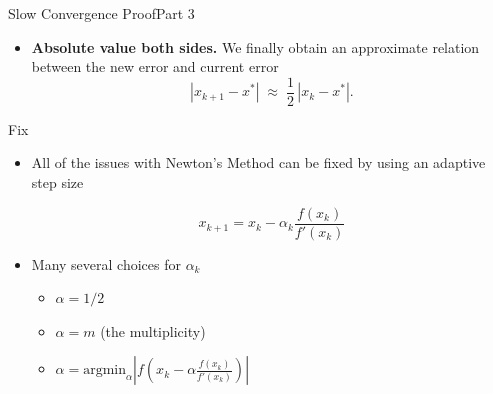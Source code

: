 \documentclass[10pt]{beamer}
\begin{document}
\begin{frame}{Slow Convergence Proof}{Part 3}

\begin{itemize}
\item[6.] \textbf{Absolute value both sides.} We finally obtain an approximate relation between the new error and current error
      \[
        |x_{k+1}-x^{*}| 
        \;\approx\;
        \frac12\,|x_k-x^{*}|.
      \]

\end{itemize}


\end{frame}
\begin{frame}{Fix}
\begin{itemize}
    \item All of the issues with Newton's Method can be fixed by using an adaptive step size 

    $$ x_{k+1} = x_k - \alpha_k \frac{f(x_k)}{f'(x_k)}$$

    \item Many several choices for $\alpha_k $
        \begin{itemize}
            \item $\alpha = 1/2$
            \item $\alpha = m $ (the multiplicity) 
            \item $\alpha = \textrm{argmin}_\alpha \left|f\left(x_k - \alpha \frac{f(x_k)}{f'(x_k)}\right) \right|$
        \end{itemize}
\end{itemize}
\end{frame}
\end{document}
